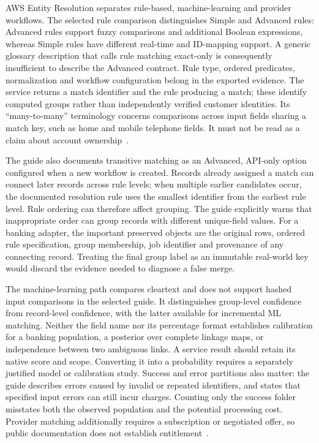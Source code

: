 AWS Entity Resolution separates rule-based, machine-learning and provider
workflows. The selected rule comparison distinguishes Simple and Advanced rules:
Advanced rules support fuzzy comparisons and additional Boolean expressions,
whereas Simple rules have different real-time and ID-mapping support. A generic
glossary description that calls rule matching exact-only is consequently
insufficient to describe the Advanced contract. Rule type, ordered predicates,
normalization and workflow configuration belong in the exported evidence.
The service returns a match identifier and the rule producing a match; these
identify computed groups rather than independently verified customer identities.
Its ``many-to-many'' terminology concerns comparisons across input fields sharing
a match key, such as home and mobile telephone fields. It must not be read as a
claim about account ownership~\citep{exec22_obs_aws_er_manual}.

The guide also documents transitive matching as an Advanced, API-only option
configured when a new workflow is created. Records already assigned a match can
connect later records across rule levels; when multiple earlier candidates occur,
the documented resolution rule uses the smallest identifier from the earliest
rule level. Rule ordering can therefore affect grouping. The guide explicitly
warns that inappropriate order can group records with different unique-field
values. For a banking adapter, the important preserved objects are the original
rows, ordered rule specification, group membership, job identifier and provenance
of any connecting record. Treating the final group label as an immutable real-world
key would discard the evidence needed to diagnose a false merge.

The machine-learning path compares cleartext and does not support hashed input
comparisons in the selected guide. It distinguishes group-level confidence from
record-level confidence, with the latter available for incremental ML matching.
Neither the field name nor its percentage format establishes calibration for a
banking population, a posterior over complete linkage maps, or independence
between two ambiguous links. A service result should retain its native score and
scope. Converting it into a probability requires a separately justified model or
calibration study. Success and error partitions also matter: the guide describes
errors caused by invalid or repeated identifiers, and states that specified input
errors can still incur charges. Counting only the success folder misstates both
the observed population and the potential processing cost. Provider matching
additionally requires a subscription or negotiated offer, so public documentation
does not establish entitlement~\citep{exec22_obs_aws_er_manual}.

